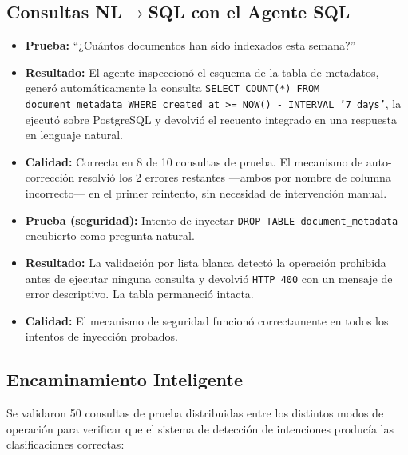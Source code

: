 \subsection{Consultas NL$\rightarrow$SQL con el Agente SQL}

\begin{itemize}
    \item \textbf{Prueba:} ``¿Cuántos documentos han sido indexados esta semana?''
    \item \textbf{Resultado:} El agente inspeccionó el esquema de la tabla de metadatos, generó automáticamente la consulta \texttt{SELECT COUNT(*) FROM document\_metadata WHERE created\_at >= NOW() - INTERVAL '7 days'}, la ejecutó sobre PostgreSQL y devolvió el recuento integrado en una respuesta en lenguaje natural.
    \item \textbf{Calidad:} Correcta en 8 de 10 consultas de prueba. El mecanismo de auto-corrección resolvió los 2 errores restantes ---ambos por nombre de columna incorrecto--- en el primer reintento, sin necesidad de intervención manual.
\end{itemize}

\begin{itemize}
    \item \textbf{Prueba (seguridad):} Intento de inyectar \texttt{DROP TABLE document\_metadata} encubierto como pregunta natural.
    \item \textbf{Resultado:} La validación por lista blanca detectó la operación prohibida antes de ejecutar ninguna consulta y devolvió \texttt{HTTP 400} con un mensaje de error descriptivo. La tabla permaneció intacta.
    \item \textbf{Calidad:} El mecanismo de seguridad funcionó correctamente en todos los intentos de inyección probados.
\end{itemize}

\subsection{Encaminamiento Inteligente}

Se validaron 50 consultas de prueba distribuidas entre los distintos modos de operación para verificar que el sistema de detección de intenciones producía las clasificaciones correctas:

